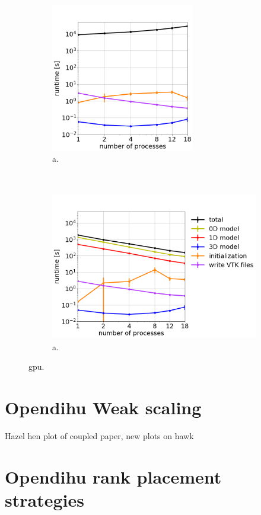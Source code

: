 \begin{figure}%
  \centering%
  \begin{subfigure}[t]{0.48\textwidth}%
    \centering%
    \includegraphics[height=6.5cm]{images/results/studies/16_hodgkin_huxley_gpu.png}%
    \caption{a.}%
    \label{fig:16_hodgkin_huxley_gpu}%
  \end{subfigure}
  \,
  \begin{subfigure}[t]{0.48\textwidth}%
    \centering%
    \includegraphics[height=6.5cm]{images/results/studies/16_hodgkin_huxley_cpu.png}%
    \caption{a.}%
    \label{fig:16_hodgkin_huxley_cpu}%
  \end{subfigure}   
  \caption{gpu.}%
  \label{fig:16_hodgkin_huxley_cpu_gpu}%
\end{figure}%

\section{Opendihu Weak scaling}
Hazel hen plot of coupled paper, new plots on hawk
\section{Opendihu rank placement strategies}

